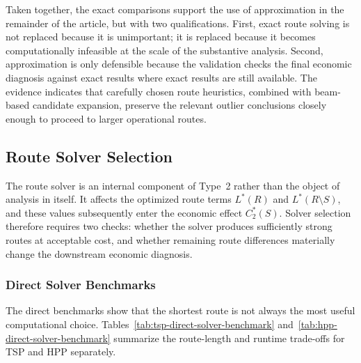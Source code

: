 \documentclass[preprint,12pt]{elsarticle}
\begin{document}
Taken together, the exact comparisons support the use of approximation in the remainder of the article, but with two qualifications. First, exact route solving is not replaced because it is unimportant; it is replaced because it becomes computationally infeasible at the scale of the substantive analysis. Second, approximation is only defensible because the validation checks the final economic diagnosis against exact results where exact results are still available. The evidence indicates that carefully chosen route heuristics, combined with beam-based candidate expansion, preserve the relevant outlier conclusions closely enough to proceed to larger operational routes.

\subsection{Route Solver Selection}
\label{subsec:route-solver-selection}

The route solver is an internal component of Type~2 rather than the object of analysis in itself. It affects the optimized route terms $L^*(R)$ and $L^*(R\setminus S)$, and these values subsequently enter the economic effect $C_2^*(S)$. Solver selection therefore requires two checks: whether the solver produces sufficiently strong routes at acceptable cost, and whether remaining route differences materially change the downstream economic diagnosis.

\subsubsection{Direct Solver Benchmarks}

The direct benchmarks show that the shortest route is not always the most useful computational choice. Tables~\ref{tab:tsp-direct-solver-benchmark} and~\ref{tab:hpp-direct-solver-benchmark} summarize the route-length and runtime trade-offs for TSP and HPP separately.
\end{document}
